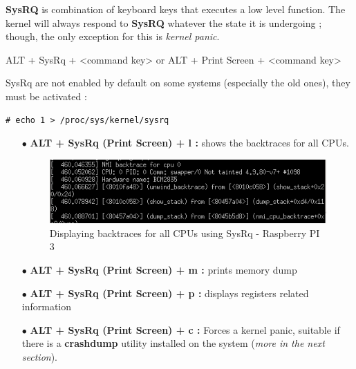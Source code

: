 \begin{itemize}
\textbf{SysRQ} is combination of keyboard keys that executes a low level function. The kernel will always respond to \textbf{SysRQ}
whatever the state it is undergoing ; though, the only exception for this is \emph{kernel panic}.
\begin{center}
ALT + SysRq + <command key>
or
ALT + Print Screen + <command key>
\end{center}


\begin{center}
\end{center}

\vspace{10px}

SysRq are not enabled by default on some systems (especially the old ones), they must be activated :

	\begin{lstlisting}[style=BashInputStyle]
# echo 1 > /proc/sys/kernel/sysrq
	\end{lstlisting}
	
	\begin{itemize}
		\item[$\bullet$] \textbf{ALT + SysRq (Print Screen) + l :} shows the backtraces for all CPUs.
		
    \begin{figure}[H]
			\centering
        	\includegraphics[scale=0.45]{img/solution/alt-sysrq-l.png}
        	\caption{Displaying backtraces for all CPUs using SysRq - Raspberry PI 3}
        	\label{Displaying backtraces for all CPUs using SysRq - Raspberry PI 3}
    \end{figure}		
		
		
		\item[$\bullet$] \textbf{ALT + SysRq (Print Screen) + m :} prints memory dump
		\item[$\bullet$] \textbf{ALT + SysRq (Print Screen) + p :} displays registers related information
		\item[$\bullet$] \textbf{ALT + SysRq (Print Screen) + c :} Forces a kernel panic, suitable if there is a \textbf{crashdump} utility installed on the system (\emph{more in the next section}).
	\end{itemize}
\end{itemize}



